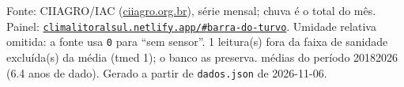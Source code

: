 \documentclass[10pt,a4paper]{article}
\begin{document}
\vspace{1pt}
{\tiny\color{cinza}
Fonte: CIIAGRO/IAC (\href{http://ciiagro.org.br}{ciiagro.org.br}), série mensal;
chuva é o total do mês. Painel:
\href{https://climalitoralsul.netlify.app/\#barra-do-turvo}%
{\texttt{climalitoralsul.netlify.app/\#barra-do-turvo}}.
Umidade relativa omitida: a fonte usa \texttt{0} para ``sem sensor''.  1 leitura(s) fora da faixa de sanidade excluída(s) da média (tmed 1); o banco as preserva.
médias do período 2018\textendash{}2026 (6.4 anos de dado).
Gerado a partir de \texttt{dados.json} de 2026-11-06.}
\end{document}

